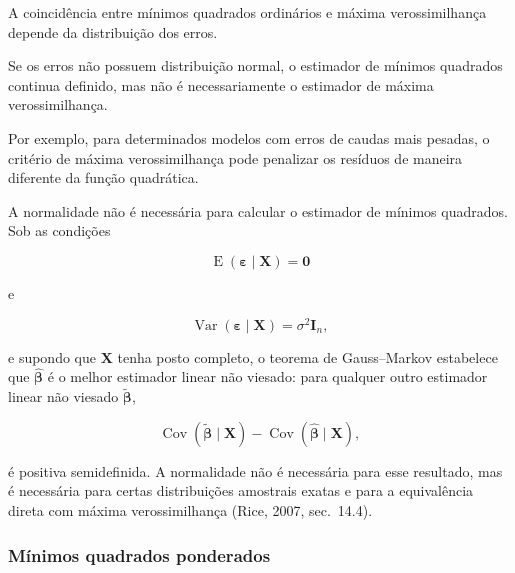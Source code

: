 \documentclass[
  letterpaper,
  DIV=11,
  numbers=noendperiod]{scrreprt}
\begin{document}
A coincidência entre mínimos quadrados ordinários e máxima
verossimilhança depende da distribuição dos erros.

\begin{tcolorbox}[enhanced jigsaw, colback=white, leftrule=.75mm, colbacktitle=quarto-callout-warning-color!10!white, breakable, titlerule=0mm, bottomtitle=1mm, title=\textcolor{quarto-callout-warning-color}{\faExclamationTriangle}\hspace{0.5em}{Observação}, colframe=quarto-callout-warning-color-frame, toprule=.15mm, opacityback=0, bottomrule=.15mm, opacitybacktitle=0.6, arc=.35mm, toptitle=1mm, rightrule=.15mm, coltitle=black, left=2mm]

Se os erros não possuem distribuição normal, o estimador de mínimos
quadrados continua definido, mas não é necessariamente o estimador de
máxima verossimilhança.

Por exemplo, para determinados modelos com erros de caudas mais pesadas,
o critério de máxima verossimilhança pode penalizar os resíduos de
maneira diferente da função quadrática.

\end{tcolorbox}

A normalidade não é necessária para calcular o estimador de mínimos
quadrados. Sob as condições

\[\operatorname{E}
(\boldsymbol\varepsilon\mid\mathbf{X})
=
\mathbf{0}\]

e

\[\operatorname{Var}
(\boldsymbol\varepsilon\mid\mathbf{X})
=
\sigma^2\mathbf{I}_n,\]

e supondo que \(\mathbf X\) tenha posto completo, o teorema de
Gauss--Markov estabelece que \(\widehat{\boldsymbol\beta}\) é o melhor
estimador linear não viesado: para qualquer outro estimador linear não
viesado \(\widetilde{\boldsymbol\beta}\),

\[\operatorname{Cov}(\widetilde{\boldsymbol\beta}\mid\mathbf X) -\operatorname{Cov}(\widehat{\boldsymbol\beta}\mid\mathbf X),\]

é positiva semidefinida. A normalidade não é necessária para esse
resultado, mas é necessária para certas distribuições amostrais exatas e
para a equivalência direta com máxima verossimilhança (Rice, 2007,
sec.~14.4).

\subsubsection{Mínimos quadrados
ponderados}\label{muxednimos-quadrados-ponderados}
\end{document}
